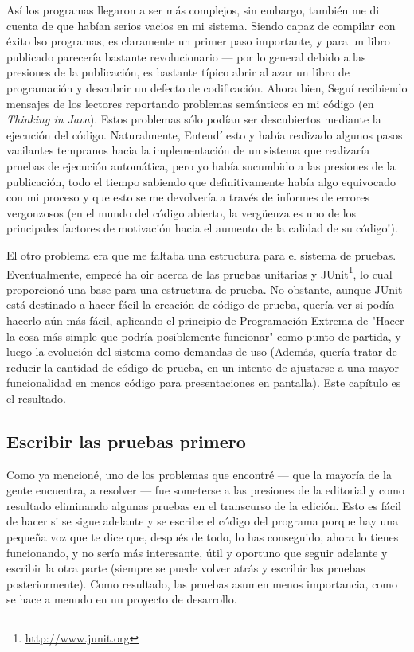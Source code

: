 Así los programas llegaron a ser más complejos, sin embargo, también me di cuenta de que habían serios vacios en mi sistema. Siendo capaz de compilar con éxito lso programas, es claramente un primer paso importante, y para un libro publicado parecería bastante revolucionario — por lo general debido a las presiones de la publicación, es bastante típico abrir al azar un libro de programación y descubrir un defecto de codificación. Ahora bien, Seguí recibiendo mensajes de los lectores reportando problemas semánticos en mi código (en \textit{Thinking in Java}). Estos problemas sólo podían ser descubiertos mediante la ejecución del código. Naturalmente, Entendí esto y había realizado algunos pasos vacilantes tempranos hacia la implementación de un sistema que realizaría pruebas de ejecución automática, pero yo había sucumbido a las presiones de la publicación, todo el tiempo sabiendo que definitivamente había algo equivocado con mi proceso y que esto se me devolvería a través de informes de errores vergonzosos (en el mundo del código abierto, la vergüenza es uno de los principales factores de motivación hacia el aumento de la calidad de su código!).         \newline

El otro problema era que me faltaba una estructura para el sistema de pruebas. Eventualmente, empecé ha oir acerca de las pruebas unitarias y JUnit\footnote{\url{http://www.junit.org}}, lo cual proporcionó una base para una estructura de prueba. No obstante, aunque JUnit está destinado a hacer fácil la creación de código de prueba, quería ver si podía hacerlo aún más fácil, aplicando el principio de Programación Extrema de "Hacer la cosa más simple que podría posiblemente funcionar" como punto de partida, y luego la evolución del sistema como demandas de uso (Además, quería tratar de reducir la cantidad de código de prueba, en un intento de ajustarse a una mayor funcionalidad en menos código para presentaciones en pantalla). Este capítulo es el resultado.

\subsection*{Escribir las pruebas primero}
\label{subsec:elpp}

Como ya mencioné, uno de los problemas que encontré — que la mayoría de la gente encuentra, a resolver —  fue someterse a las presiones de la editorial y como resultado eliminando algunas pruebas en el transcurso de la edición. Esto es fácil de hacer si se sigue adelante y se escribe el código del programa porque hay una pequeña voz que te dice que, después de todo, lo has conseguido, ahora lo tienes funcionando, y no sería más interesante, útil y oportuno que seguir adelante y escribir la otra parte (siempre se puede volver atrás y escribir las pruebas posteriormente). Como resultado, las pruebas asumen menos importancia, como se hace a menudo en un proyecto de desarrollo.  \newline

